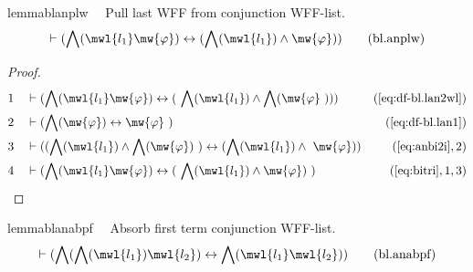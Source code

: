 \begin{restatable}{lemma}{blanplw}~~ Pull last WFF from conjunction WFF-list.
\begin{align}
\vdash ( \bigwedge( \mwl{l_1} \mw{\varphi} ) \leftrightarrow ( \bigwedge(
    \mwl{l_1} ) \wedge \mw{\varphi} ) )\label{eq:bl.anplw}\tag{bl.anplw}
\end{align}
\end{restatable}

\begin{proof}
\begin{align}
  1 &&  & \vdash ( \bigwedge( \mwl{l_1} \mw{\varphi} ) \leftrightarrow (
     ~\bigwedge( \mwl{l_1} ) \wedge \bigwedge( \mw{\varphi}
     ~) ) )&(\mbox{\ref{eq:df-bl.lan2wl}})\notag
  \\ 2 &&  & \vdash ( \bigwedge( \mw{\varphi} ) \leftrightarrow \mw{\varphi}
     ~)&(\mbox{\ref{eq:df-bl.lan1}})\notag
  \\ 3 &&  & \vdash ( ( \bigwedge( \mwl{l_1} ) \wedge \bigwedge( \mw{\varphi} )
     ~) \leftrightarrow ( \bigwedge( \mwl{l_1} ) \wedge
     ~\mw{\varphi} ) )&(\mbox{\ref{eq:anbi2i}},2)\notag
  \\ 4 &&  & \vdash ( \bigwedge( \mwl{l_1} \mw{\varphi} ) \leftrightarrow (
     ~\bigwedge( \mwl{l_1} ) \wedge \mw{\varphi} )
     ~)&(\mbox{\ref{eq:bitri}},1,3)\notag
\end{align}
\end{proof}

\begin{restatable}{lemma}{blanabpf}~~ Absorb first term conjunction WFF-list.
\begin{align}
\vdash ( \bigwedge( \bigwedge( \mwl{l_1} ) \mwl{l_2} ) \leftrightarrow
    \bigwedge( \mwl{l_1} \mwl{l_2} ) )\label{eq:bl.anabpf}\tag{bl.anabpf}
\end{align}
\end{restatable}

